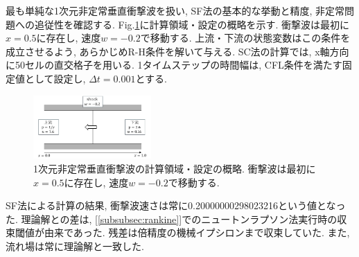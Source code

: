 \documentclass[a4j]{jarticle}
\begin{document}
最も単純な1次元非定常垂直衝撃波を扱い, SF法の基本的な挙動と精度, 非定常問題への追従性を確認する.
Fig.\ref{fig:1Dsituation}に計算領域・設定の概略を示す.
衝撃波は最初に$x=0.5$に存在し, 速度$w=-0.2$で移動する.
上流・下流の状態変数はこの条件を成立させるよう, あらかじめR-H条件を解いて与える.
SC法の計算では, x軸方向に50セルの直交格子を用いる.
1タイムステップの時間幅は, CFL条件を満たす固定値として設定し, $\Delta t = 0.001$とする.
\begin{figure}[!b]
    \vspace*{-5mm}
    \begin{center}
        \includegraphics[width=0.4\textwidth]{1Dsituation.pdf}
    \end{center}
    \caption{1次元非定常垂直衝撃波の計算領域・設定の概略.
    衝撃波は最初に$x=0.5$に存在し, 速度$w=-0.2$で移動する.}
    \label{fig:1Dsituation}
\end{figure}
SF法による計算の結果, 衝撃波速さは常に0.20000000298023216という値となった.
理論解との差は, [\ref{subsubsec:rankine}]でのニュートンラプソン法実行時の収束閾値が由来であった. 
残差は倍精度の機械イプシロンまで収束していた. また, 流れ場は常に理論解と一致した.
\end{document}
